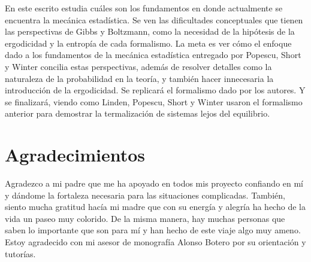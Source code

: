\documentclass[11pt]{book}
\theoremstyle{definition}
\begin{document}
\vspace*{4em}

En este escrito estudia cuáles son los fundamentos en donde actualmente se encuentra la mecánica estadística. Se ven las dificultades conceptuales que tienen las perspectivas de Gibbs y Boltzmann, como la necesidad de la hipótesis de la ergodicidad y la entropía de cada formalismo. La meta es ver cómo el enfoque dado a los fundamentos de la mecánica estadística entregado por Popescu, Short y Winter \cite{Popescu2006} concilia estas perspectivas, además de resolver detalles como la naturaleza de la probabilidad en la teoría, y también hacer innecesaria la introducción de la ergodicidad. Se replicará el formalismo dado por los autores. Y se finalizará, viendo como Linden, Popescu, Short y Winter \cite{LindenPaper} usaron el formalismo anterior para demostrar la termalización de sistemas lejos del equilibrio.





\chapter*{Agradecimientos}
Agradezco a mi padre que me ha apoyado en todos mis proyecto confiando en mí y dándome la fortaleza necesaria para las situaciones complicadas. También, siento mucha gratitud hacía mi madre que con su energía y alegría ha hecho de la vida un paseo muy colorido. De la misma manera, hay muchas personas que saben lo importante que son para mí y han hecho de este viaje algo muy ameno. Estoy agradecido con mi asesor de monografía Alonso Botero por su orientación y tutorías.







\end{document}
